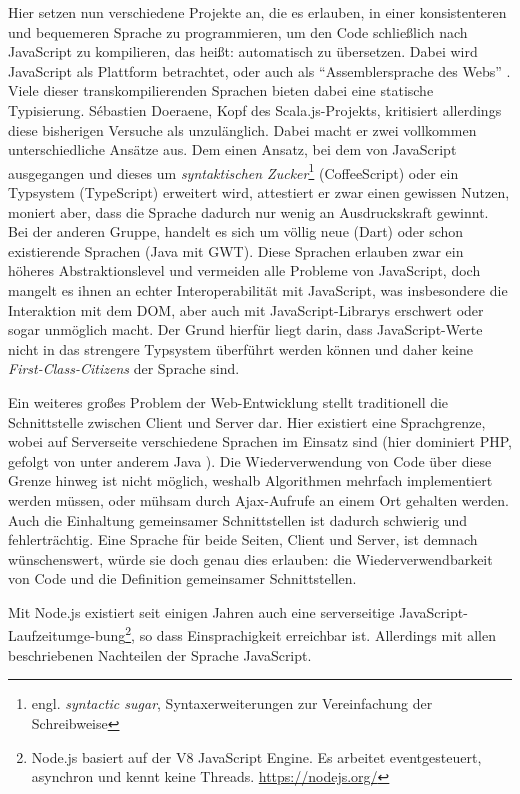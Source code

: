\documentclass[a4paper, 12pt, hidelinks, listof=totoc, listoftables=totoc, bibliography=totoc]{scrreprt}
\begin{document}
Hier setzen nun verschiedene Projekte an, die es erlauben, in einer konsistenteren und bequemeren Sprache zu programmieren, um den Code schließlich nach JavaScript zu kompilieren, das heißt: automatisch zu übersetzen. Dabei wird JavaScript als Plattform betrachtet, oder auch als "`Assemblersprache des Webs"' \cite{meijer2011.JLA}. Viele dieser transkompilierenden Sprachen bieten dabei eine statische Typisierung. Sébastien Doeraene, Kopf des Scala.js-Projekts, kritisiert allerdings diese bisherigen Versuche als unzulänglich. Dabei macht er zwei vollkommen unterschiedliche Ansätze aus. Dem einen Ansatz, bei dem von \mbox{JavaScript} ausgegangen und dieses um \emph{syntaktischen Zucker}\footnote{engl. \emph{syntactic sugar}, Syntaxerweiterungen zur Vereinfachung der Schreibweise} (CoffeeScript) oder ein Typsystem (TypeScript) erweitert wird, attestiert er zwar einen gewissen Nutzen, moniert aber, dass die Sprache dadurch nur wenig an Ausdruckskraft gewinnt. Bei der anderen Gruppe, handelt es sich um völlig neue (Dart) oder schon existierende Sprachen (Java mit GWT). Diese Sprachen erlauben zwar ein höheres Abstraktionslevel und vermeiden alle Probleme von JavaScript, doch mangelt es ihnen an echter Interoperabilität mit \mbox{JavaScript}, was insbesondere die Interaktion mit dem \ac{DOM}, aber auch mit JavaScript-Librarys erschwert oder sogar unmöglich macht. Der Grund hierfür liegt darin, dass JavaScript-Werte nicht in das strengere Typsystem überführt werden können und daher keine \emph{First-Class-Citizens} der Sprache sind. \cite[S. 1]{doeraene2013.TDI}

Ein weiteres großes Problem der Web-Entwicklung stellt traditionell die Schnittstelle zwischen Client und Server dar. Hier existiert eine Sprachgrenze, wobei auf Serverseite verschiedene Sprachen im Einsatz sind (hier dominiert PHP, gefolgt von unter anderem Java \cite{w3techs.SRV}). Die Wiederverwendung von Code über diese Grenze hinweg ist nicht möglich, weshalb Algorithmen mehrfach implementiert werden müssen, oder mühsam durch Ajax-Aufrufe an einem Ort gehalten werden. Auch die Einhaltung gemeinsamer Schnittstellen ist dadurch schwierig und fehlerträchtig. Eine Sprache für beide Seiten, Client und Server, ist demnach wünschenswert, würde sie doch genau dies erlauben: die Wiederverwendbarkeit von Code und die Definition gemeinsamer Schnittstellen. \cite[\#SharingCode]{haoyi.HOS}

Mit Node.js existiert seit einigen Jahren auch eine serverseitige JavaScript-Laufzeitumge-bung\footnote{Node.js basiert auf der V8 JavaScript Engine. Es arbeitet eventgesteuert, asynchron und kennt keine Threads. \url{https://nodejs.org/}}, so dass Einsprachigkeit erreichbar ist. Allerdings mit allen beschriebenen Nachteilen der Sprache JavaScript.
\end{document}
